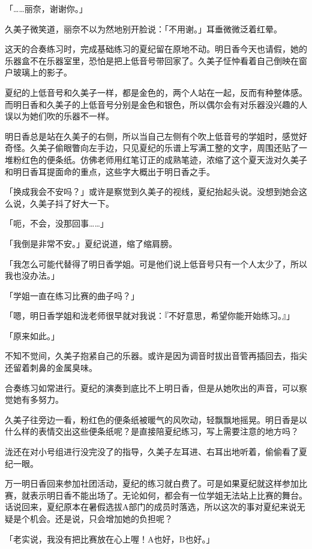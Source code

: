 \documentclass[UTF8]{ctexart}
\begin{document}
    「……丽奈，谢谢你。」 

    久美子微笑道，丽奈不以为然地别开脸说：「不用谢。」耳垂微微泛着红晕。 

    这天的合奏练习时，完成基础练习的夏纪留在原地不动。明日香今天也请假，她的乐器盒不在乐器室里，恐怕是把上低音号带回家了。久美子怔忡看着自己倒映在窗户玻璃上的影子。 

    夏纪的上低音号和久美子一样，都是金色的，两个人站在一起，反而有种整体感。而明日香和久美子的上低音号分别是金色和银色，所以偶尔会有对乐器没兴趣的人误以为她们吹的乐器不一样。 

    明日香总是站在久美子的右侧，所以当自己左侧有个吹上低音号的学姐时，感觉好奇怪。久美子偷眼瞥向左手边，只见夏纪的乐谱上写满工整的文字，周围还贴了一堆粉红色的便条纸。仿佛老师用红笔订正的成熟笔迹，浓缩了这个夏天泷对久美子和明日香耳提面命的重点，这些字大概出于明日香之手。 

    「换成我会不安吗？」或许是察觉到久美子的视线，夏纪抬起头说。没想到她会这么说，久美子抖了好大一下。 

    「呃，不会，没那回事……」 

    「我倒是非常不安。」夏纪说道，缩了缩肩膀。 

    「我怎么可能代替得了明日香学姐。可是他们说上低音号只有一个人太少了，所以我也没办法。」 

    「学姐一直在练习比赛的曲子吗？」 

    「嗯，明日香学姐和泷老师很早就对我说：『不好意思，希望你能开始练习。』」 

    「原来如此。」 

    不知不觉间，久美子抱紧自己的乐器。或许是因为调音时拔出音管再插回去，指尖还留着刺鼻的金属臭味。 

    合奏练习如常进行。夏纪的演奏到底比不上明日香，但是从她吹出的声音，可以察觉她有多努力。 

    久美子往旁边一看，粉红色的便条纸被暖气的风吹动，轻飘飘地摇晃。明日香是以什么样的表情交出这些便条纸呢？是直接陪夏纪练习，写上需要注意的地方吗？ 

    泷还在对小号组进行没完没了的指导，久美子左耳进、右耳出地听着，偷偷看了夏纪一眼。 

    万一明日香回来参加社团活动，夏纪的练习就白费了。可是如果夏纪就这样参加比赛，就表示明日香不能出场了。无论如何，都会有一位学姐无法站上比赛的舞台。话说回来，夏纪原本在暑假选拔A部门的成员时落选，所以这次的事对夏纪来说无疑是个机会。还是说，只会增加她的负担呢？ 

    「老实说，我没有把比赛放在心上喔！A也好，B也好。」 
\end{document}
